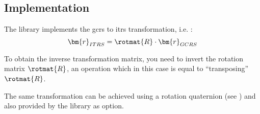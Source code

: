 \subsection{Implementation}

The library implements the \gls{gcrs} to \gls{itrs} transformation, i.e. :
\begin{equation}
  \bm{r}_{ITRS} = \rotmat{R} \cdot \bm{r}_{GCRS}
\end{equation}

To obtain the inverse transformation matrix, you need to invert the rotation 
matrix $\rotmat{R}$, an operation which in this case is equal to ``transposing'' 
$\rotmat{R}$.

The same transformation can be achieved using a rotation quaternion (see \cite{Bizouard2023}) 
and also provided by the library as option.
